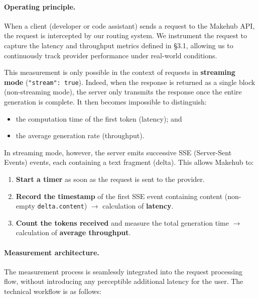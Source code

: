 \documentclass[english]{article}
\begin{document}
\paragraph{Operating principle.}

When a client (developer or code assistant) sends a request to the Makehub API, the request is intercepted by our routing system. We instrument the request to capture the latency and throughput metrics defined in §3.1, allowing us to continuously track provider performance under real-world conditions.

This measurement is only possible in the context of requests in \textbf{streaming mode} (\texttt{"stream": true}). Indeed, when the response is returned as a single block (non-streaming mode), the server only transmits the response once the entire generation is complete. It then becomes impossible to distinguish:
\begin{itemize}
    \item the computation time of the first token (latency); and
    \item the average generation rate (throughput).
\end{itemize}

In streaming mode, however, the server emits successive SSE (Server-Sent Events) events, each containing a text fragment (delta). This allows Makehub to:
\begin{enumerate}
    \item \textbf{Start a timer} as soon as the request is sent to the provider.
    \item \textbf{Record the timestamp} of the first SSE event containing content (non-empty \texttt{delta.content}) $\rightarrow$ calculation of \textbf{latency}.
    \item \textbf{Count the tokens received} and measure the total generation time $\rightarrow$ calculation of \textbf{average throughput}.
\end{enumerate}

\paragraph{Measurement architecture.}

The measurement process is seamlessly integrated into the request processing flow, without introducing any perceptible additional latency for the user. The technical workflow is as follows:
\end{document}
